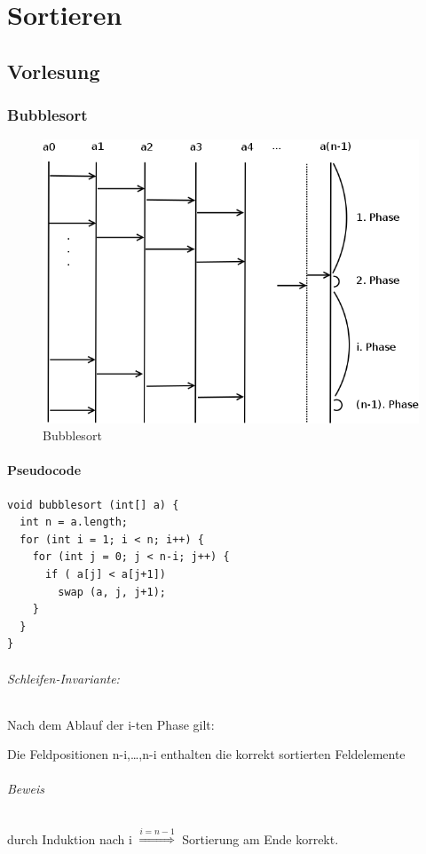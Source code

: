 \part{Sortieren}
\chapter{Vorlesung}
\section{Bubblesort}


\begin{figure}[H]
\begin{center}
\includegraphics[width=0.8\linewidth]{01/Grafik/Bubblesort.png}
\caption{Bubblesort}
\end{center}
\end{figure}


\subsection{Pseudocode}
\begin{lstlisting}
void bubblesort (int[] a) {
  int n = a.length;
  for (int i = 1; i < n; i++) {
    for (int j = 0; j < n-i; j++) {
      if ( a[j] < a[j+1])
        swap (a, j, j+1);
    }
  }
}
\end{lstlisting}
\paragraph{Schleifen-Invariante:} Nach dem Ablauf der i-ten Phase gilt:
\begin{center}
	Die Feldpositionen n-i,\ldots,n-i enthalten die korrekt sortierten Feldelemente
\end{center}
\paragraph{Beweis} durch Induktion nach i $\overset{i=n-1}{\Longrightarrow}$ Sortierung am Ende korrekt.


